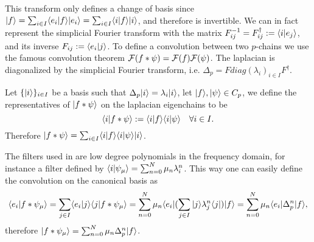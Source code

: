 \documentclass[../1.tex]{subfiles}
\begin{document}
    This transform only defines a change of basis since $| f \rangle = \sum_{i \in I}\langle e_i | f \rangle| e_i \rangle = \sum_{i \in I}\langle i | f \rangle| i \rangle$, and therefore is invertible.
    We can in fact represent the simplicial Fourier transform with the matrix $F^{-1}_{ij} = F^\dagger_{ij} := \langle i | e_j \rangle$, and its inverse $F_{ij} := \langle e_i | j \rangle$.
    To define a convolution between two $p$-chains we use the famous convolution theorem $\mathcal{F}(f * \psi) = \mathcal{F}(f)\mathcal{F}(\psi)$. The laplacian is diagonalized by the simplicial
    Fourier transform, i.e. $\Delta_p = F diag(\lambda_i)_{i \in I} F^\dagger$.

    \begin{defn}
        Let $\{| i \rangle\}_{i \in I}$ be a basis such that $\Delta_p| i \rangle = \lambda_i| i \rangle$, let $| f \rangle,| \psi \rangle \in C_p$, we define the representatives of $| f * \psi \rangle$ on
        the laplacian eigenchains to be 
        \[ \langle i | f * \psi \rangle := \langle i | f \rangle\langle i | \psi \rangle \quad \forall i \in I.\]
        Therefore $| f * \psi \rangle = \sum_{i \in I}\langle i | f \rangle\langle i | \psi \rangle| i \rangle$.
    \end{defn}

    The filters used in \cite{simplicialNN} are low degree polynomials in the frequency domain, for instance a filter defined by $\langle i | \psi_\mu \rangle = \sum_{n = 0}^N \mu_n \lambda_i^n$.
    This way one can easily define the convolution on the canonical basis as 
    \[\langle e_i | f * \psi_\mu \rangle = \sum_{j \in I}\langle e_i | j \rangle\langle j | f*\psi_\mu \rangle = \sum_{n = 0}^N\mu_n \langle e_i |(\sum_{j \in I}| j \rangle\lambda_j^n\langle j |)| f \rangle
     = \sum_{n=0}^N \mu_n \langle e_i |\Delta_p^n| f \rangle,\]
    therefore $| f*\psi_\mu \rangle = \sum_{n = 0}^N \mu_n \Delta_p^n| f \rangle$.
    
\end{document}
